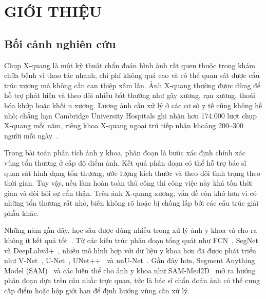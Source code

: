\chapter{GIỚI THIỆU}
\label{Chapter1}

\section{Bối cảnh nghiên cứu}
\label{sec:boi_canh}

Chụp X-quang là một kỹ thuật chẩn đoán hình ảnh rất quen thuộc trong khám chữa bệnh vì thao tác nhanh, chi phí không quá cao và có thể quan sát được cấu trúc xương mà không cần can thiệp xâm lấn. Ảnh X-quang thường được dùng để hỗ trợ phát hiện và theo dõi nhiều bất thường như gãy xương, rạn xương, thoái hóa khớp hoặc khối u xương. Lượng ảnh cần xử lý ở các cơ sở y tế cũng không hề nhỏ; chẳng hạn Cambridge University Hospitals ghi nhận hơn 174.000 lượt chụp X-quang mỗi năm, riêng khoa X-quang ngoại trú tiếp nhận khoảng 200--300 người mỗi ngày~\cite{cuh2024xray}.

Trong bài toán phân tích ảnh y khoa, phân đoạn là bước xác định chính xác vùng tổn thương ở cấp độ điểm ảnh. Kết quả phân đoạn có thể hỗ trợ bác sĩ quan sát hình dạng tổn thương, ước lượng kích thước và theo dõi tình trạng theo thời gian. Tuy vậy, nếu làm hoàn toàn thủ công thì công việc này khá tốn thời gian và đòi hỏi sự cẩn thận. Trên ảnh X-quang xương, vấn đề còn khó hơn vì có những tổn thương rất nhỏ, biên không rõ hoặc bị chồng lấp bởi các cấu trúc giải phẫu khác.

Những năm gần đây, học sâu được dùng nhiều trong xử lý ảnh y khoa và cho ra không ít kết quả tốt~\cite{litjens2017survey,shen2017review,minaee2021survey}. Từ các kiến trúc phân đoạn tổng quát như FCN~\cite{long2015fcn}, SegNet~\cite{badrinarayanan2017segnet} và DeepLabv3+~\cite{chen2018deeplabv3plus}, nhiều mô hình hợp với dữ liệu y khoa hơn đã được phát triển như V-Net~\cite{milletari2016vnet}, U-Net~\cite{ronneberger2015unet}, UNet++~\cite{zhou2018unetplusplus} và nnU-Net~\cite{isensee2021nnunet}. Gần đây hơn, Segment Anything Model (SAM)~\cite{2023-SAM-Kirillov} và các biến thể cho ảnh y khoa như SAM-Med2D~\cite{2023-SAMMed2D-Cheng} mở ra hướng phân đoạn dựa trên câu nhắc trực quan, tức là bác sĩ chẩn đoán ảnh có thể cung cấp điểm hoặc hộp giới hạn để định hướng vùng cần xử lý.

